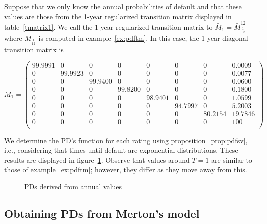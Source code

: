 \documentclass[11pt,fleqn]{book} %
\begin{document}
\begin{example}
	\label{ex:pdfsv}
	Suppose that we only know the annual probabilities of default and that these 
	values are those from the 1-year regularized transition matrix displayed in
	table~\ref{tmatrix1}. We call the 1-year regularized transition matrix to 
	$\bar{M}_1 = \bar{M}_{\frac{1}{12}}^{12}$ where $\bar{M}_{\frac{1}{12}}$ 
	is computed in example~\ref{ex:pdftm}. In this case, the 1-year diagonal 
	transition matrix is
	{\small
	\begin{displaymath}
		M_1 = \left(
		\begin{array}{cccccccc}
			99.9991 & 0 & 0 & 0 & 0 & 0 & 0 & 0.0009 \\
			0 & 99.9923 & 0 & 0 & 0 & 0 & 0 & 0.0077 \\
			0 & 0 & 99.9400 & 0 & 0 & 0 & 0 & 0.0600 \\
			0 & 0 & 0 & 99.8200 & 0 & 0 & 0 & 0.1800 \\
			0 & 0 & 0 & 0 & 98.9401 & 0 & 0 & 1.0599 \\
			0 & 0 & 0 & 0 & 0 & 94.7997 & 0 & 5.2003 \\
			0 & 0 & 0 & 0 & 0 & 0 & 80.2154 & 19.7846 \\
			0 & 0 & 0 & 0 & 0 & 0 & 0 & 100 \\
		\end{array}
		\right)
	\end{displaymath}\par}
	We determine the PD's function for each rating using  
	proposition~\ref{prop:pdfsv}, i.e., considering that times-until-default
	are exponential distributions. These results are displayed in 
	figure~\ref{fig:pdfsv}. Observe that values around $T=1$ are similar 
	to those of example~\ref{ex:pdftm}; however, they differ as they move 
	away from this.
\end{example}

\begin{figure}[!ht]
	\centering
	\caption{PDs derived from annual values}
	\label{fig:pdfsv}
\end{figure}

\subsection{Obtaining PDs from Merton's model}
\label{pdfmm}
\end{document}
